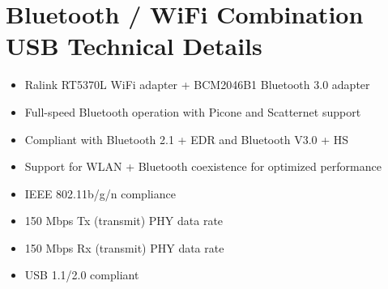 \section*{Bluetooth / WiFi Combination USB Technical Details} %
\label{sec:bluetooth_wifi_combination_usb_technical_details}
\begin{itemize}
    \item Ralink RT5370L WiFi adapter + BCM2046B1 Bluetooth 3.0 adapter
    \item Full-speed Bluetooth operation with Picone and Scatternet support
    \item Compliant with Bluetooth 2.1 + EDR and Bluetooth V3.0 + HS
    \item Support for WLAN + Bluetooth coexistence for optimized performance
    \item IEEE 802.11b/g/n compliance
    \item 150 Mbps Tx (transmit) PHY data rate
    \item 150 Mbps Rx (transmit) PHY data rate
    \item USB 1.1/2.0 compliant
\end{itemize}
